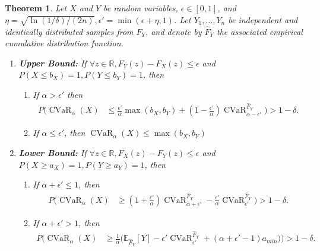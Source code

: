 \documentclass[acmlarge, manuscript, screen, review, natbib=false, oneside]{acmart}
\newtheorem{theorem}{Theorem}[section]
\DeclareMathOperator{\CVaR}{CVaR}
\begin{document}
\begin{theorem}
	\label{prf:ecdf_y_bound_cvar_x}
	Let $X$ and $Y$ be random variables, $\epsilon \in [0, 1]$, and $\eta = \sqrt{\ln(1/\delta)/(2n)}, \epsilon'=\min(\epsilon+\eta, 1)$. Let $Y_1, \dots, Y_n$ be independent and identically distributed samples from $F_Y$, and denote by $\hat{F}_Y$ the associated empirical cumulative distribution function.
	\begin{enumerate}
		\item \textbf{Upper Bound:} If $\forall z\in \mathbb{R},F_Y(z)-F_X(z)\leq \epsilon$ and $P(X\leq b_X)=1, P(Y\leq b_Y)=1$, then
		
		\begin{enumerate}
			\item If $\alpha > \epsilon'$ then \begin{equation}
				\begin{aligned}
					P\Big(\CVaR_\alpha(X) &\leq \frac{\epsilon'}{\alpha}\max(b_X,b_Y) 
					+ (1 - \frac{\epsilon'}{\alpha})\CVaR_{\alpha-\epsilon'}^{\hat{F}_Y}\Big)>1-\delta.
				\end{aligned}
			\end{equation}
			
			\item If $\alpha \leq \epsilon'$, then $\CVaR_\alpha(X)\leq \max(b_X,b_Y)$
		\end{enumerate}
		
		\item \textbf{Lower Bound:} If $\forall z\in \mathbb{R},F_X(z)-F_Y(z)\leq \epsilon$ and $P(X\geq a_X)=1,P(Y\geq a_Y)=1$, then \begin{enumerate}
			\item If $\alpha+\epsilon' \leq 1$, then \begin{equation}
				\begin{aligned}
					P\Big(\CVaR_{\alpha}(X)&\geq (1+\frac{\epsilon'}{\alpha})\CVaR_{\alpha+\epsilon'}^{\hat{F}_Y} 
					-\frac{\epsilon'}{\alpha} \CVaR_{\epsilon'}^{\hat{F}_Y}\Big)>1-\delta.
				\end{aligned}
			\end{equation}
			
			\item If $\alpha+\epsilon' > 1$, then \begin{equation}
				\begin{aligned}
					P\Big(\CVaR_\alpha(X) &\geq \frac{1}{\alpha}\big(\mathbb{E}_{\hat{F}_Y}[Y] - \epsilon' \CVaR_{\epsilon'}^{\hat{F}_Y}
					+ (\alpha+\epsilon'-1)a_{min}\big) \Big) > 1-\delta.
				\end{aligned}
			\end{equation}
		\end{enumerate}
	\end{enumerate}
\end{theorem}
\end{document}
